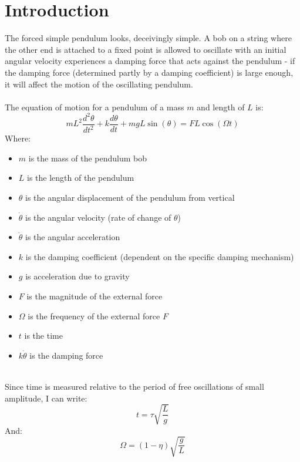 \documentclass[10pt, twocolumn]{article}
\begin{document}
\section{Introduction}
The forced simple pendulum looks, deceivingly simple. A bob on a string where the other end is attached to a fixed point is allowed to oscillate with an initial angular velocity experiences a damping force that acts against the pendulum - if the damping force (determined partly by a damping coefficient) is large enough, it will affect the motion of the oscillating pendulum. \\
\\
The equation of motion for a pendulum of a mass $m$ and length of $L$ is:
\begin{equation}
    mL^2 \frac{d^2\theta}{dt^2} + k \frac{d\theta}{dt} + mgL\sin({\theta}) = FL\cos({\Omega}t)
    \label{oscillation}
\end{equation}
Where:
\begin{itemize}
    \item $m$ is the mass of the pendulum bob
    \item $L$ is the length of the pendulum
    \item $\theta$ is the angular displacement of the pendulum from vertical
    \item $\dot{\theta}$ is the angular velocity (rate of change of $\theta$)
    \item $\ddot{\theta}$ is the angular acceleration
    \item $k$ is the damping coefficient (dependent on the specific damping mechanism)
    \item $g$ is acceleration due to gravity
    \item $F$ is the magnitude of the external force
    \item $\Omega$ is the frequency of the external force $F$
    \item $t$ is the time
    \item $k\dot{\theta}$ is the damping force
\end{itemize}
\\
Since time is measured relative to the period of free oscillations of small amplitude, I can write:
\begin{equation}
    t = \tau\sqrt{\frac{L}{g}}
    \label{modified time}
\end{equation}
And:
\begin{equation}
    \Omega = (1 - \eta)\sqrt{\frac{g}{L}}
    \label{modified omega}
\end{equation}
\end{document}
